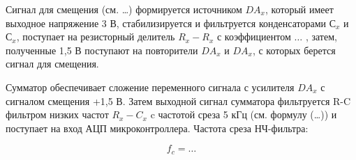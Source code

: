 Сигнал для смещения (см. \ldots) формируется источником {$DA_x$}, который имеет выходное напряжение 3 В, 
стабилизируется и фильтруется конденсаторами $С_x$ и $С_x$, поступает на резисторный делитель $R_x-R_x$ с коэффициентом $\ldots$ , 
затем, полученные 1,5 В поступают на повторители $DA_x$ и $DA_x$, с которых берется сигнал для смещения.


Сумматор обеспечивает сложение переменного сигнала с усилителя $DA_x$ с сигналом смещения +1,5 В. 
Затем выходной сигнал сумматора фильтруется R-C фильтром низких частот $R_x-C_x$ c частотой среза 5 кГц 
(см. формулу (\ldots)) и поступает на вход АЦП микроконтроллера.
Частота среза НЧ-фильтра:

$$
f_c = \ldots
$$


